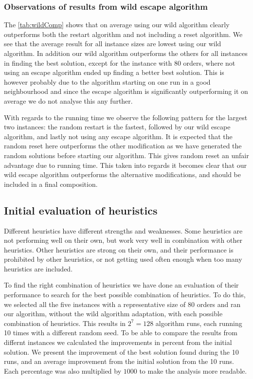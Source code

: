 \documentclass[../main.tex]{subfiles}
\begin{document}
\subsubsection{Observations of results from wild escape algorithm}
The \cref{tab:wildComp} shows that on average using our wild algorithm clearly outperforms both the restart algorithm and not including a reset algorithm. 
We see that the average result for all instance sizes are lowest using our wild algorithm. 
In addition our wild algorithm outperforms the others for all instances in finding the best solution, except for the instance with 80 orders, where not using an escape algorithm ended up finding a better best solution. 
This is however probably due to the algorithm starting on one run in a good neighbourhood and since the escape algorithm is significantly outperforming it on average we do not analyse this any further. 
\par
With regards to the running time we observe the following pattern for the largest two instances: the random restart is the fastest, followed by our wild escape algorithm, and lastly not using any escape algorithm. 
It is expected that the random reset here outperforms the other modification as we have generated the random solutions before starting our algorithm. This gives random reset an unfair advantage due to running time. 
This taken into regards it becomes clear that our wild escape algorithm outperforms the alternative modifications, and should be included in a final composition.

\subsection{Initial evaluation of heuristics}
\label{sec:evalH1}
Different heuristics have different strengths and weaknesses. Some heuristics are not performing well on their own, but work very well in combination with other heuristics. 
Other heuristics are strong on their own, and their performance is prohibited by other heuristics, or not getting used often enough when too many heuristics are included.

\par To find the right combination of heuristics we have done an evaluation of their performance to search for the best possible combination of heuristics. 
To do this, we selected all the five instances with a representative size of 80 orders and ran our algorithm, without the wild algorithm adaptation, with each possible combination of heuristics.
This results in $2^7 = 128$ algorithm runs, each running 10 times with a different random seed. 
To be able to compare the results from differnt instances we calculated the improvements in percent from the initial solution. 
We present the improvement of the best solution found during the 10 runs, and an average improvement from the initial solution from the 10 runs. 
Each percentage was also multiplied by $1000$ to make the analysis more readable. 
\end{document}
